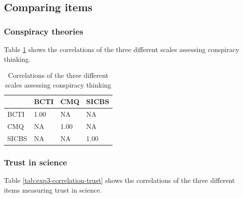 \documentclass[
  doc,floatsintext]{apa6}
\begin{document}
\subsection{Comparing items}\label{comparing-items-2}

\subsubsection{Conspiracy theories}\label{conspiracy-theories-2}

Table \ref{tab:exp3-correlation-conspiracy} shows the correlations of the three different scales assessing conspiracy thinking.

\begin{table}[h]

\begin{center}
\begin{threeparttable}

\caption{\label{tab:exp3-correlation-conspiracy}Correlations of the three different scales assessing conspiracy thinking}

\begin{tabular}{llll}
\toprule
 & \multicolumn{1}{c}{BCTI} & \multicolumn{1}{c}{CMQ} & \multicolumn{1}{c}{SICBS}\\
\midrule
BCTI & 1.00 & NA & NA\\
CMQ & NA & 1.00 & NA\\
SICBS & NA & NA & 1.00\\
\bottomrule
\end{tabular}

\end{threeparttable}
\end{center}

\end{table}

\subsubsection{Trust in science}\label{trust-in-science-7}

Table \ref{tab:exp3-correlation-trust} shows the correlations of the three different items measuring trust in science.
\end{document}
